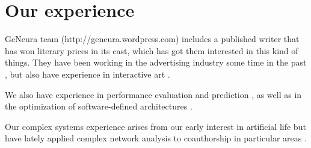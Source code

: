 \documentclass[a4paper]{article}
\begin{document}
\section{Our experience}

GeNeura team (http://geneura.wordpress.com) includes a published
writer that has won literary prices in its cast, which has got them
interested in this kind of things. They have been working in the
advertising industry some time in the past
\cite{merelo:ecal97,AISB97}, but also have experience in interactive
art \cite{DBLP:conf/cec/TrujilloVVG13,DBLP:conf/cec/FernandesIBRG11}.


We also have experience in performance evaluation and prediction
\cite{castillo:evostar08,hardwareevo}, as well as in the optimization of
software-defined architectures \cite{gecco08:castillo}.

Our complex systems experience arises from our early interest in
artificial life \cite{ecal93} but have lately applied complex network
analysis to coauthorship in particular areas
\cite{ec-network-2007,merelo2013complex,DBLP:journals/corr/abs-1108-0261}. 




\end{document}

